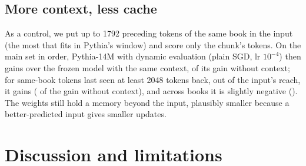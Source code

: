 \documentclass[times,twocolumn,final,authoryear]{elsarticle}
\begin{document}
\begin{table}[t]
\caption{Four PG-19 books of 200k tokens, read book after book: loss, gain over frozen Pythia-14M ($\pm$ SE over 4 books, paired) and share of the gap between frozen 14M and frozen 31M closed. Dynamic evaluation: plain SGD on all parameters.}
\label{tab:verylong}
\centering\footnotesize\setlength{\tabcolsep}{3pt}
\end{table}

\subsection{More context, less cache}\label{sec:context}

As a control, we put up to 1792 preceding tokens of the same book in the input (the most that fits in Pythia's window) and score only the chunk's tokens.
On the main set in order, Pythia-14M with dynamic evaluation (plain SGD, lr $10^{-4}$) then gains \fcGainAllPM{} over the frozen model with the same context, \fcShareAll{} of its gain without context; for same-book tokens last seen at least 2048 tokens back, out of the input's reach, it gains \fcGainSameFarPM{} (\fcShareSameFar{} of the gain without context), and across books it is slightly negative (\fcGainEarlierFarPM{}).
The weights still hold a memory beyond the input, plausibly smaller because a better-predicted input gives smaller updates.

\section{Discussion and limitations}
\end{document}
